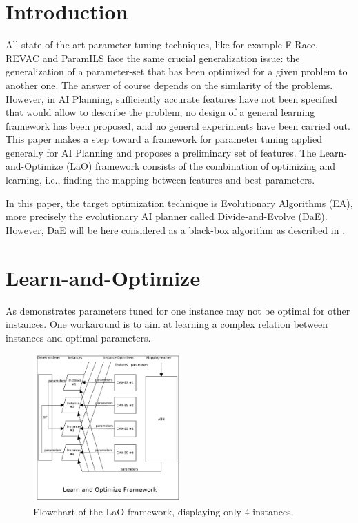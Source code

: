 \documentclass{sig-alt-release2}
\begin{document}



\section{Introduction}

All state of the art parameter tuning techniques, like for example F-Race, REVAC and ParamILS \cite{Montero:2010} face the same crucial generalization issue: the generalization of a parameter-set that has been optimized for a given problem to another one. The answer of course depends on the similarity of the problems. However, in AI Planning, sufficiently accurate features have not been specified that would allow to describe the problem, no design of a general learning framework has been proposed, and no general experiments have been carried out. This paper makes a step toward a framework for parameter tuning applied generally for AI Planning and proposes a preliminary set of features. The Learn-and-Optimize (LaO) framework consists of the combination of optimizing and learning, i.e., finding the mapping between features and best parameters.

In this paper, the target optimization technique is Evolutionary Algorithms (EA), more precisely the evolutionary AI planner called Divide-and-Evolve (DaE). However, DaE will be here considered as a black-box algorithm as described in \cite{BibEvoCop:2010}. 

\section{Learn-and-Optimize}
\label{section:LaO}

As \cite{BibGECCO:2010} demonstrates parameters tuned for one instance may not be optimal for other instances. One workaround is to aim at learning a complex relation between instances and optimal parameters.

\begin{figure}[h!]
  \centering
    \includegraphics[width=0.5\textwidth]{lao.png}
  \caption{Flowchart of the LaO framework, displaying only 4 instances.}
\label{figure:laoflowchart}
\end{figure}
\end{document}
